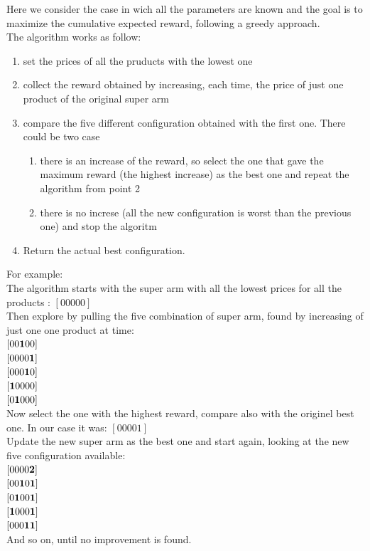 Here we consider the case in wich all the parameters are known and the goal is to maximize the cumulative expected reward, following a greedy approach.\\
The algorithm works as follow:
\begin{enumerate}
    \item set the prices of all the pruducts with the lowest one
    \item collect the reward obtained by increasing, each time, the price of just one product of the original super arm
    \item compare the five different configuration obtained with the first one. There could be two case\begin{enumerate}
        \item there is an increase of the reward, so select the one that gave the maximum reward (the highest increase) as the best one and repeat the algorithm from point 2
        \item there is no increse (all the new configuration is worst than the previous one) and stop the algoritm 
    \end{enumerate}
    \item Return the actual best configuration.
\end{enumerate}
For example:\\
The algorithm starts with the super arm with all the lowest prices for all the products : $[0 0 0 0 0]$\\
Then explore by pulling the five combination of super arm, found by increasing of just one one product at time: \\
$[0 0 {\bf1} 0 0]$\\
$[0 0 0 0 {\bf1}]$\\
$[0 0 0 {\bf1} 0]$\\
$[{\bf1} 0 0 0 0]$\\
$[0 {\bf1} 0 0 0]$\\
Now select the one with the highest reward, compare also with the originel best one. In our case it was: $[0 0 0 0 1]$\\ Update the new super arm as the best one and start again, looking at the new five configuration available:\\
$[0 0 0 0 {\bf2}]$\\
$[0 0 {\bf1} 0 {\bf1}]$\\
$[0 {\bf1} 0 0 {\bf1}]$\\
$[{\bf1} 0 0 0 {\bf1}]$\\
$[0 0 0 {\bf1} {\bf1}]$\\
And so on, until no improvement is found.
